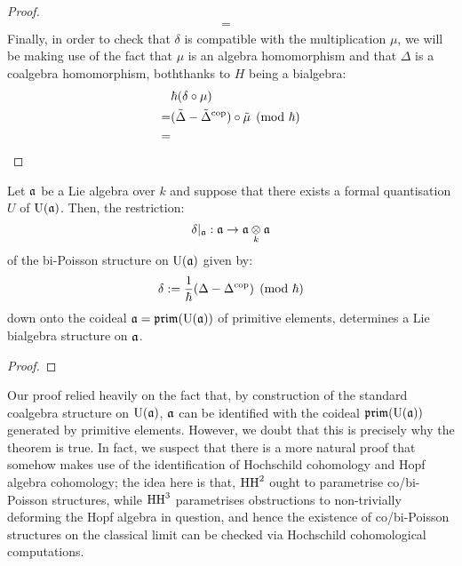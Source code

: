 \begin{proof}
$$\begin{aligned}
                            = & 
                        \end{aligned}
                    $$
                Finally, in order to check that $\delta$ is compatible with the multiplication $\mu$, we will be making use of the fact that $\mu$ is an algebra homomorphism and that $\Delta$ is a coalgebra homomorphism, boththanks to $H$ being a bialgebra:
                    $$
                        \begin{aligned}
                            & \hbar( \delta \circ \mu )
                            \\
                            = & (\tilde{\Delta} - \tilde{\Delta}^{\mathrm{cop}}) \circ \tilde{\mu} \pmod{\hbar}
                            \\
                            = & 
                        \end{aligned}
                    $$
            \end{proof}
        \begin{theorem} \label{theorem: lie_bialgebra_structures_from_bi_poisson_structures}
            Let $\mathfrak{a}$ be a Lie algebra over $k$ and suppose that there exists a formal quantisation $U$ of $\mathrm{U}(\mathfrak{a})$. Then, the restriction:
                $$\delta|_{\a}: \a \to \a \tensor_k \a$$
            of the bi-Poisson structure on $\mathrm{U}(\mathfrak{a})$ given by:
                $$\delta := \frac{1}{\hbar}(\Delta - \Delta^{\mathrm{cop}}) \pmod{\hbar}$$
            down onto the coideal $\mathfrak{a} = \mathfrak{prim}(\mathrm{U}(\mathfrak{a}))$ of primitive elements, determines a Lie bialgebra structure on $\mathfrak{a}$.    
        \end{theorem}
            \begin{proof}
                
            \end{proof}
        \begin{remark}
            Our proof relied heavily on the fact that, by construction of the standard coalgebra structure on $\mathrm{U}(\mathfrak{a})$, $\mathfrak{a}$ can be identified with the coideal $\mathfrak{prim}(\mathrm{U}(\mathfrak{a}))$ generated by primitive elements. However, we doubt that this is precisely why the theorem is true. In fact, we suspect that there is a more natural proof that somehow makes use of the identification of Hochschild cohomology and Hopf algebra cohomology; the idea here is that, $\mathrm{HH}^2$ ought to parametrise co/bi-Poisson structures, while $\mathrm{HH}^3$ parametrises obstructions to non-trivially deforming the Hopf algebra in question, and hence the existence of co/bi-Poisson structures on the classical limit can be checked via Hochschild cohomological computations. 
        \end{remark}
    
